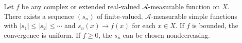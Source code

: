 Let $f$ be any complex or extended real-valued $\mathcal{A}$-measurable function on $X$. There exists a sequence $(s_n)$ of finite-valued, $\mathcal{A}$-measurable simple functions with $|s_1| \leq |s_2| \leq \cdots$ and $s_n(x) \to f(x)$ for each $x \in X$. If $f$ is bounded, the convergence is uniform. If $f \geq 0$, the $s_n$ can be chosen nondecreasing.
